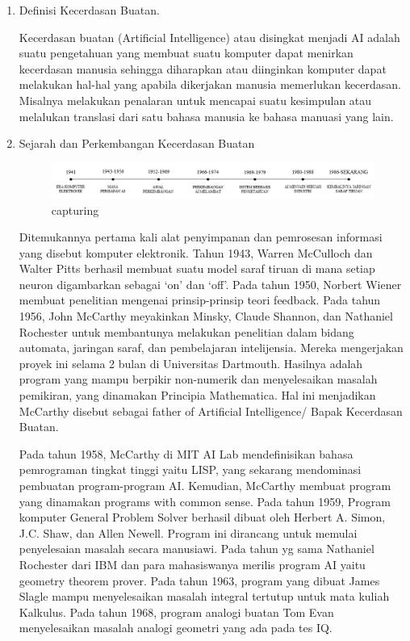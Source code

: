 \begin{enumerate}
\item Definisi Kecerdasan Buatan.

Kecerdasan buatan (Artificial Intelligence) atau disingkat menjadi AI adalah suatu pengetahuan yang membuat suatu komputer dapat menirkan  kecerdasan manusia sehingga diharapkan atau diinginkan komputer dapat melakukan hal-hal yang apabila dikerjakan manusia memerlukan kecerdasan. Misalnya melakukan penalaran untuk mencapai suatu kesimpulan atau melalukan translasi dari satu bahasa manusia ke bahasa manuasi yang lain.

\item Sejarah dan Perkembangan Kecerdasan Buatan
\par
\begin{figure}[ht]
\centering
\includegraphics[scale=0.5]{figures/Screenshot_1.png}
\caption{capturing}
\label{perkembangan}
\end{figure}


Ditemukannya pertama kali alat penyimpanan dan pemrosesan informasi yang disebut komputer elektronik. Tahun 1943, Warren McCulloch dan Walter Pitts berhasil membuat suatu model saraf tiruan di mana setiap neuron digambarkan sebagai ‘on’ dan ‘off’. Pada tahun 1950, Norbert Wiener membuat penelitian mengenai prinsip-prinsip teori feedback. Pada tahun 1956, John McCarthy meyakinkan Minsky, Claude Shannon, dan Nathaniel Rochester untuk membantunya melakukan penelitian dalam bidang automata, jaringan saraf, dan pembelajaran intelijensia. Mereka mengerjakan proyek ini selama 2 bulan di Universitas Dartmouth. Hasilnya adalah program yang mampu berpikir non-numerik dan menyelesaikan masalah pemikiran, yang dinamakan Principia Mathematica. Hal ini menjadikan McCarthy disebut sebagai father of Artificial Intelligence/ Bapak Kecerdasan Buatan.

Pada tahun 1958, McCarthy di MIT AI Lab mendefinisikan bahasa pemrograman tingkat tinggi yaitu LISP, yang sekarang mendominasi pembuatan program-program AI. Kemudian, McCarthy membuat program yang dinamakan programs with common sense. Pada tahun 1959, Program komputer General Problem Solver berhasil dibuat oleh Herbert A. Simon, J.C. Shaw, dan Allen Newell. Program ini dirancang untuk memulai penyelesaian masalah secara manusiawi. Pada tahun yg sama Nathaniel Rochester dari IBM dan para mahasiswanya merilis program AI yaitu geometry theorem prover. Pada tahun 1963, program yang dibuat James Slagle mampu menyelesaikan masalah integral tertutup untuk mata kuliah Kalkulus. Pada tahun 1968, program analogi buatan Tom Evan menyelesaikan masalah analogi geometri yang ada pada tes IQ.


\end{enumerate}
